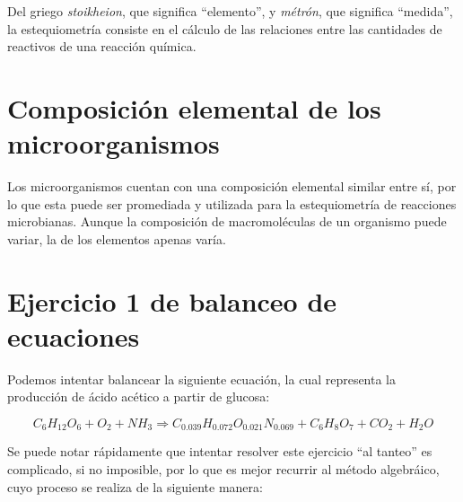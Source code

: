 Del griego \textit{stoikheion}, que significa ``elemento'', y \textit{métrón}, que significa ``medida'', la estequiometría consiste en el cálculo de las relaciones entre las cantidades de reactivos de una reacción química.

\section{Composición elemental de los microorganismos}

Los microorganismos cuentan con una composición elemental similar entre sí, por lo que esta puede ser promediada y utilizada para la estequiometría de reacciones microbianas.
Aunque la composición de macromoléculas de un organismo puede variar, la de los elementos apenas varía. 

    

\section{Ejercicio 1 de balanceo de ecuaciones}

Podemos intentar balancear la siguiente ecuación, la cual representa la producción de ácido acético a partir de glucosa:

\begin{equation*}
    C_{6}H_{12}O_{6} + O_{2} + NH_{3} \Longrightarrow C_{0.039}H_{0.072}O_{0.021}N_{0.069} + C_{6}H_{8}O_{7} + CO_{2} + H_{2}O
\end{equation*}

Se puede notar rápidamente que intentar resolver este ejercicio ``al tanteo'' es complicado, si no imposible, por lo que es mejor recurrir al método algebráico, cuyo proceso se realiza de la siguiente manera:


